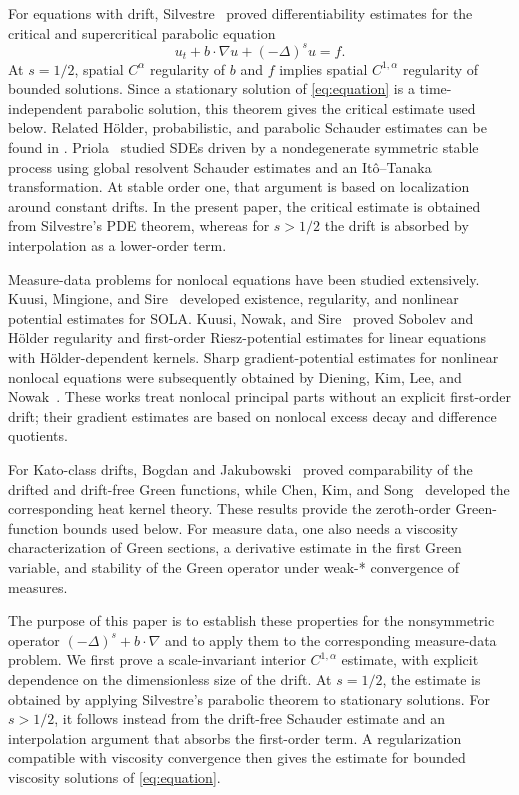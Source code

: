 \documentclass[10pt,a4paper]{amsart}
\numberwithin{equation}{section}
\begin{document}
For equations with drift, Silvestre~\cite{Silvestre2012Diff} proved
differentiability estimates for the critical and supercritical parabolic
equation
\[
 u_t+b\cdot\nabla u+(-\Delta)^s u=f.
\]
At $s=1/2$, spatial $C^\alpha$ regularity of $b$ and $f$ implies spatial
$C^{1,\alpha}$ regularity of bounded solutions.  Since a stationary solution
of \eqref{eq:equation} is a time-independent parabolic solution, this theorem
gives the critical estimate used below.  Related H\"older, probabilistic, and
parabolic Schauder estimates can be found in
\cite{Silvestre2012Holder,Priola2012,Chaudru2020}.  Priola~\cite{Priola2012}
studied SDEs driven by a nondegenerate symmetric stable process using global
resolvent Schauder estimates and an It\^o--Tanaka transformation.  At stable
order one, that argument is based on localization around constant drifts.  In
the present paper, the critical estimate is obtained from Silvestre's PDE
theorem, whereas for $s>1/2$ the drift is absorbed by interpolation as a
lower-order term.

Measure-data problems for nonlocal equations have been studied extensively.
Kuusi, Mingione, and Sire~\cite{KuusiMingioneSire2015} developed existence,
regularity, and nonlinear potential estimates for SOLA.  Kuusi, Nowak, and
Sire~\cite{KuusiNowakSire2022} proved Sobolev and H\"older regularity and
first-order Riesz-potential estimates for linear equations with
H\"older-dependent kernels.  Sharp gradient-potential estimates for nonlinear
nonlocal equations were subsequently obtained by Diening, Kim, Lee, and
Nowak~\cite{DieningKimLeeNowak2025}.  These works treat nonlocal principal
parts without an explicit first-order drift; their gradient estimates are
based on nonlocal excess decay and difference quotients.

For Kato-class drifts, Bogdan and Jakubowski~\cite{BogdanJakubowski2012}
proved comparability of the drifted and drift-free Green functions, while
Chen, Kim, and Song~\cite{ChenKimSong2012} developed the corresponding heat
kernel theory.  These results provide the zeroth-order Green-function bounds
used below.  For measure data, one also needs a viscosity characterization of
Green sections, a derivative estimate in the first Green variable, and
stability of the Green operator under weak-* convergence of measures.

The purpose of this paper is to establish these properties for the
nonsymmetric operator $(-\Delta)^s+b\cdot\nabla$ and to apply them to the
corresponding measure-data problem.  We first prove a scale-invariant interior
$C^{1,\alpha}$ estimate, with explicit dependence on the dimensionless size of
the drift.  At $s=1/2$, the estimate is obtained by applying Silvestre's
parabolic theorem to stationary solutions.  For $s>1/2$, it follows instead
from the drift-free Schauder estimate and an interpolation argument that
absorbs the first-order term.  A regularization compatible with viscosity
convergence then gives the estimate for bounded viscosity solutions of
\eqref{eq:equation}.
\end{document}
